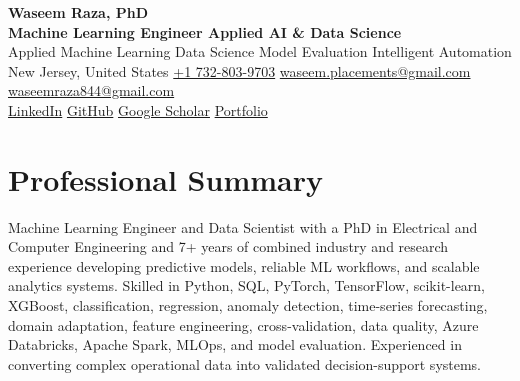 \documentclass[9pt,letterpaper]{extarticle}
\begin{document}
\begin{center}
{\LARGE\bfseries Waseem Raza, PhD}\\[2pt]
{\large\bfseries Machine Learning Engineer \textbar{} Applied AI \& Data Science}\\[1pt]
{\small Applied Machine Learning \textbar{} Data Science \textbar{} Model Evaluation \textbar{} Intelligent Automation}\\[3pt]
{\footnotesize New Jersey, United States \quad {}\enspace \href{tel:+17328039703}{+1 732-803-9703} \quad {}\enspace \href{mailto:waseem.placements@gmail.com}{waseem.placements@gmail.com} \textbar{} \href{mailto:waseemraza844@gmail.com}{waseemraza844@gmail.com}\\[1pt]\href{https://www.linkedin.com/in/waseem-raza-phd-9a737858/}{LinkedIn} \textbar{} \href{https://github.com/WaseemRaza844}{GitHub} \textbar{} \href{https://scholar.google.com/citations?user=d58Drr0AAAAJ\&hl=en}{Google Scholar} \textbar{} \href{https://waseemraza844.github.io/portfolio/}{Portfolio}}
\end{center}
\vspace{-5pt}
\section{Professional Summary}
Machine Learning Engineer and Data Scientist with a PhD in Electrical and Computer Engineering and 7+ years of combined industry and research experience developing predictive models, reliable ML workflows, and scalable analytics systems. Skilled in Python, SQL, PyTorch, TensorFlow, scikit-learn, XGBoost, classification, regression, anomaly detection, time-series forecasting, domain adaptation, feature engineering, cross-validation, data quality, Azure Databricks, Apache Spark, MLOps, and model evaluation. Experienced in converting complex operational data into validated decision-support systems.
\end{document}
